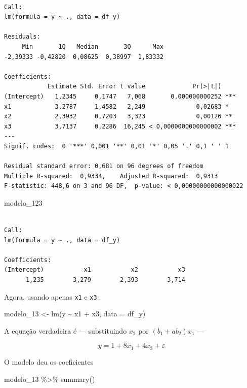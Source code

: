\documentclass[
  letterpaper,
  DIV=11,
  numbers=noendperiod]{scrreprt}
\newenvironment{Shaded}{\begin{snugshade}}{\end{snugshade}}
\newcommand{\AttributeTok}[1]{\textcolor[rgb]{0.40,0.45,0.13}{#1}}
\newcommand{\FunctionTok}[1]{\textcolor[rgb]{0.28,0.35,0.67}{#1}}
\newcommand{\NormalTok}[1]{\textcolor[rgb]{0.00,0.23,0.31}{#1}}
\newcommand{\OtherTok}[1]{\textcolor[rgb]{0.00,0.23,0.31}{#1}}
\newcommand{\SpecialCharTok}[1]{\textcolor[rgb]{0.37,0.37,0.37}{#1}}
\begin{document}
\begin{verbatim}

Call:
lm(formula = y ~ ., data = df_y)

Residuals:
     Min       1Q   Median       3Q      Max 
-2,39333 -0,42820  0,08625  0,38997  1,83332 

Coefficients:
            Estimate Std. Error t value             Pr(>|t|)    
(Intercept)   1,2345     0,1747   7,068       0,000000000252 ***
x1            3,2787     1,4582   2,249              0,02683 *  
x2            2,3932     0,7203   3,323              0,00126 ** 
x3            3,7137     0,2286  16,245 < 0,0000000000000002 ***
---
Signif. codes:  0 '***' 0,001 '**' 0,01 '*' 0,05 '.' 0,1 ' ' 1

Residual standard error: 0,681 on 96 degrees of freedom
Multiple R-squared:  0,9334,    Adjusted R-squared:  0,9313 
F-statistic: 448,6 on 3 and 96 DF,  p-value: < 0,00000000000000022
\end{verbatim}

\begin{Shaded}
\begin{Highlighting}[]
\NormalTok{modelo\_123}
\end{Highlighting}
\end{Shaded}

\begin{verbatim}

Call:
lm(formula = y ~ ., data = df_y)

Coefficients:
(Intercept)           x1           x2           x3  
      1,235        3,279        2,393        3,714  
\end{verbatim}

Agora, usando apenas \texttt{x1} e \texttt{x3}:

\begin{Shaded}
\begin{Highlighting}[]
\NormalTok{modelo\_13 }\OtherTok{\textless{}{-}} \FunctionTok{lm}\NormalTok{(y }\SpecialCharTok{\textasciitilde{}}\NormalTok{ x1 }\SpecialCharTok{+}\NormalTok{ x3, }\AttributeTok{data =}\NormalTok{ df\_y)}
\end{Highlighting}
\end{Shaded}

A equação verdadeira é --- substituindo $x_2$ por $(b_1 + ab_2)x_1$ ---

\[
y = 1 + 8 x_1 + 4 x_3 + \varepsilon
\]

O modelo deu os coeficientes

\begin{Shaded}
\begin{Highlighting}[]
\NormalTok{modelo\_13 }\SpecialCharTok{\%\textgreater{}\%} \FunctionTok{summary}\NormalTok{()}
\end{Highlighting}
\end{Shaded}
\end{document}
